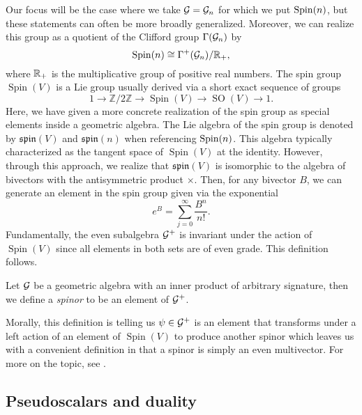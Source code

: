 Our focus will be the case where we take $\mathcal{G}=\mathcal{G}_n$ for which we put $\operatorname{Spin}(n)$, but these statements can often be more broadly generalized. Moreover, we can realize this group as a quotient of the Clifford group $\Gamma(\mathcal{G}_n)$ by
\begin{equation}
\operatorname{Spin}(n) \cong \Gamma^+(\mathcal{G}_n)/\mathbb{R}_+,
\end{equation}
where $\mathbb{R}_+$ is the multiplicative group of positive real numbers. The spin group $\operatorname{Spin}(V)$ is a Lie group usually derived via a short exact sequence of groups
\begin{equation}
1 \to \mathbb{Z}/2\mathbb{Z} \to \operatorname{Spin}(V) \to \operatorname{SO}(V) \to 1.
\end{equation}
Here, we have given a more concrete realization of the spin group as special elements inside a geometric algebra. The Lie algebra of the spin group is denoted by $\mathfrak{spin}(V)$ and $\mathfrak{spin}(n)$ when referencing $\operatorname{Spin}(n)$. This algebra typically characterized as the tangent space of $\operatorname{Spin}(V)$ at the identity. However, through this approach, we realize that $\mathfrak{spin}(V)$ is isomorphic to the algebra of bivectors with the antisymmetric product $\times$.  Then, for any bivector $B$, we can generate an element in the spin group given via the exponential
\begin{equation}
e^{B} = \sum_{j=0}^\infty \frac{B^n}{n!}.
\end{equation}
Fundamentally, the even subalgebra $\mathcal{G}^+$ is invariant under the action of $\operatorname{Spin}(V)$ since all elements in both sets are of even grade. This definition follows.
\begin{definition}
Let $\mathcal{G}$ be a geometric algebra with an inner product of arbitrary signature, then we define a \emph{spinor} to be an element of $\mathcal{G}^+$.
\end{definition}
Morally, this definition is telling us $\psi \in \mathcal{G}^+$ is an element that transforms under a left action of an element of $\operatorname{Spin}(V)$ to produce another spinor which leaves us with a convenient definition in that a spinor is simply an even multivector. For more on the topic, see \cite{janssens_special_nodate}.


\subsection{Pseudoscalars and duality}
\label{subsubsec:duality_and_pseudoscalars}

